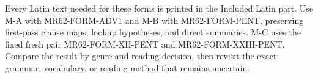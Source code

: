   Every Latin text needed for these forms is printed in the Included Latin
  part. Use M-A with MR62-FORM-ADV1 and M-B with MR62-FORM-PENT, preserving
  first-pass clause maps, lookup hypotheses, and direct summaries. M-C uses the
  fixed fresh pair MR62-FORM-XII-PENT and MR62-FORM-XXIII-PENT. Compare the
  result by genre and reading decision, then revisit the exact grammar,
  vocabulary, or reading method that remains uncertain.

